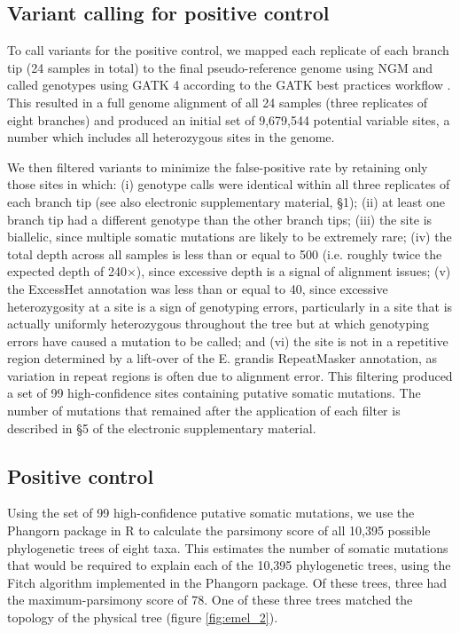 \subsection{Variant calling for positive control}

To call variants for the positive control, we mapped each replicate of each branch tip (24 samples in total) to the final pseudo-reference genome using NGM and called genotypes using GATK 4 according to the GATK best practices workflow \parencite{auwera_fastq_2013}. This resulted in a full genome alignment of all 24 samples (three replicates of eight branches) and produced an initial set of 9,679,544 potential variable sites, a number which includes all heterozygous sites in the genome.

We then filtered variants to minimize the false-positive rate by retaining only those sites in which: (i) genotype calls were identical within all three replicates of each branch tip (see also electronic supplementary material, §1); (ii) at least one branch tip had a different genotype than the other branch tips; (iii) the site is biallelic, since multiple somatic mutations are likely to be extremely rare; (iv) the total depth across all samples is less than or equal to 500 (i.e. roughly twice the expected depth of 240×), since excessive depth is a signal of alignment issues; (v) the ExcessHet annotation was less than or equal to 40, since excessive heterozygosity at a site is a sign of genotyping errors, particularly in a site that is actually uniformly heterozygous throughout the tree but at which genotyping errors have caused a mutation to be called; and (vi) the site is not in a repetitive region determined by a lift-over of the E. grandis RepeatMasker annotation, as variation in repeat regions is often due to alignment error. This filtering produced a set of 99 high-confidence sites containing putative somatic mutations. The number of mutations that remained after the application of each filter is described in §5 of the electronic supplementary material.

\subsection{Positive control}

Using the set of 99 high-confidence putative somatic mutations, we use the Phangorn package in R \parencite{schliep_phangorn_2011} to calculate the parsimony score of all 10,395 possible phylogenetic trees of eight taxa. This estimates the number of somatic mutations that would be required to explain each of the 10,395 phylogenetic trees, using the Fitch algorithm implemented in the Phangorn package. Of these trees, three had the maximum-parsimony score of 78. One of these three trees matched the topology of the physical tree (figure \ref{fig:emel_2}). 

